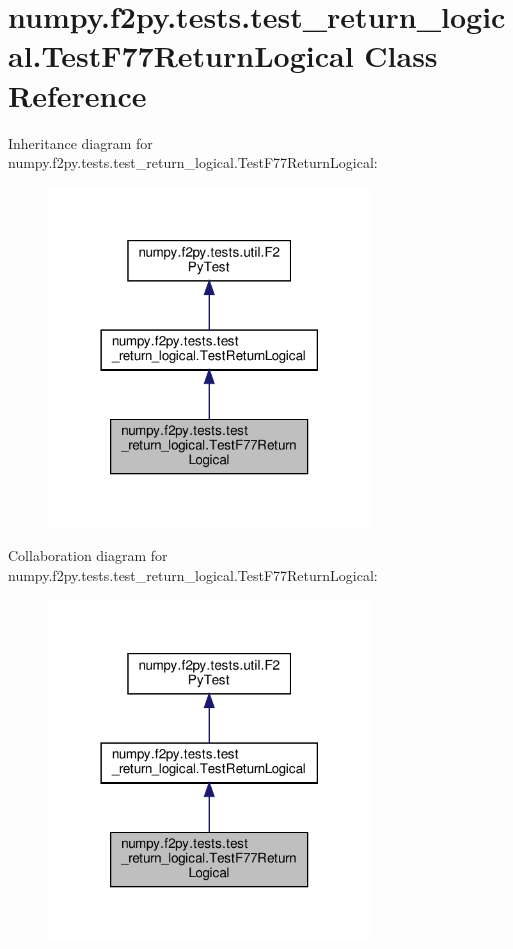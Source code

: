 \hypertarget{classnumpy_1_1f2py_1_1tests_1_1test__return__logical_1_1TestF77ReturnLogical}{}\section{numpy.\+f2py.\+tests.\+test\+\_\+return\+\_\+logical.\+Test\+F77\+Return\+Logical Class Reference}
\label{classnumpy_1_1f2py_1_1tests_1_1test__return__logical_1_1TestF77ReturnLogical}


Inheritance diagram for numpy.\+f2py.\+tests.\+test\+\_\+return\+\_\+logical.\+Test\+F77\+Return\+Logical\+:
\nopagebreak
\begin{figure}[H]
\begin{center}
\leavevmode
\includegraphics[width=242pt]{classnumpy_1_1f2py_1_1tests_1_1test__return__logical_1_1TestF77ReturnLogical__inherit__graph}
\end{center}
\end{figure}


Collaboration diagram for numpy.\+f2py.\+tests.\+test\+\_\+return\+\_\+logical.\+Test\+F77\+Return\+Logical\+:
\nopagebreak
\begin{figure}[H]
\begin{center}
\leavevmode
\includegraphics[width=242pt]{classnumpy_1_1f2py_1_1tests_1_1test__return__logical_1_1TestF77ReturnLogical__coll__graph}
\end{center}
\end{figure}
